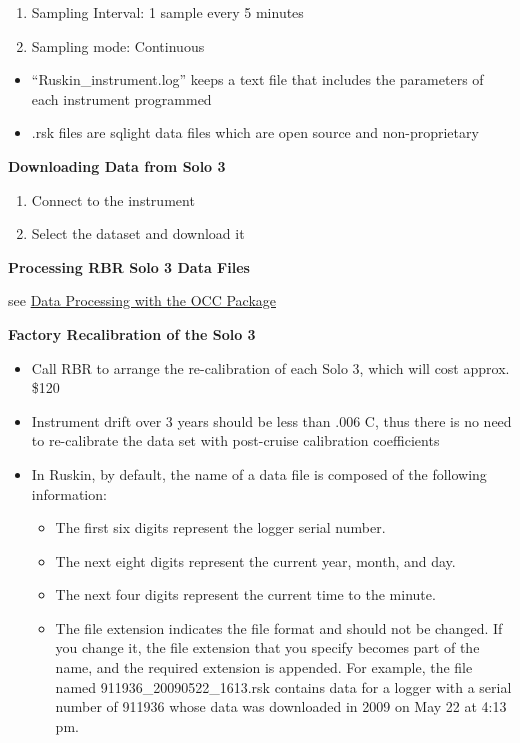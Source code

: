 \documentclass[
]{book}
\providecommand{\tightlist}{%
  \setlength{\itemsep}{0pt}\setlength{\parskip}{0pt}}
\begin{document}
\begin{enumerate}
\def\labelenumi{\alph{enumi}.}
\item
  Sampling Interval: 1 sample every 5 minutes
\item
  Sampling mode: Continuous
\end{enumerate}

\begin{itemize}
\item
  ``Ruskin\_instrument.log'' keeps a text file that includes the parameters of each instrument programmed
\item
  .rsk files are sqlight data files which are open source and non-proprietary
\end{itemize}

\textbf{Downloading Data from Solo 3}

\begin{enumerate}
\def\labelenumi{\arabic{enumi}.}
\item
  Connect to the instrument
\item
  Select the dataset and download it
\end{enumerate}

\textbf{Processing RBR Solo 3 Data Files}

see \protect\hyperlink{data_processing}{Data Processing with the OCC Package}

\textbf{Factory Recalibration of the Solo 3}

\begin{itemize}
\item
  Call RBR to arrange the re-calibration of each Solo 3, which will cost approx. \$120
\item
  Instrument drift over 3 years should be less than .006 C, thus there is no need to re-calibrate the data set with post-cruise calibration coefficients
\item
  In Ruskin, by default, the name of a data file is composed of the following information:

  \begin{itemize}
  \tightlist
  \item
    The first six digits represent the logger serial number.
  \item
    The next eight digits represent the current year, month, and day.
  \item
    The next four digits represent the current time to the minute.
  \item
    The file extension indicates the file format and should not be changed. If you change it, the file extension that you specify becomes part of the name, and the required extension is appended. For example, the file named 911936\_20090522\_1613.rsk contains data for a logger with a serial number of 911936 whose data was downloaded in 2009 on May 22 at 4:13 pm.
  \end{itemize}
\end{itemize}
\end{document}
